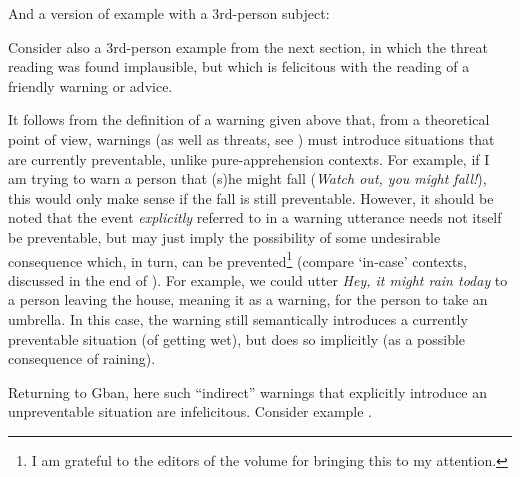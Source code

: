\documentclass[output=paper,colorlinks,citecolor=brown
]{langscibook}
\begin{document}
 And a version of example  with a 3rd-person subject:

\z

 Consider also a 3rd-person example  from the next section, in which the threat reading was found implausible, but which is felicitous with the reading of a friendly warning or advice.

It follows from the definition of a warning given above that, from a theoretical point of view, warnings (as well as threats, see ) must introduce situations that are currently preventable, unlike pure-apprehension contexts. For example, if I am trying to warn a person that (s)he might fall (\textit{Watch out, you might fall!}), this would only make sense if the fall is still preventable. However, it should be noted that the event \textit{explicitly} referred to in a warning utterance needs not itself be preventable, but may just imply the possibility of some undesirable consequence which, in turn, can be prevented\footnote{I am grateful to the editors of the volume for bringing this to my attention.} (compare `in-case' contexts, discussed in the end of ). For example, we could utter \textit{Hey, it might rain today} to a person leaving the house, meaning it as a warning,  for the person to take an umbrella. In this case, the warning still semantically introduces a currently preventable situation (of getting wet), but does so implicitly (as a possible consequence of raining).

Returning to Gban, here such ``indirect'' warnings that explicitly introduce an unpreventable situation are infelicitous. Consider example .

\z
\end{document}
